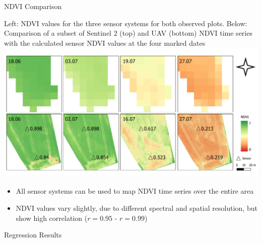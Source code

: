 \documentclass[final,hyperref={pdfpagelabels=false}]{beamer}
\begin{document}
\begin{frame}
\begin{minipage}[t][][t]{0.48\paperwidth}
\begin{block}{NDVI Comparison}
\begin{minipage}{0.16\paperwidth}
{
}%

\end{minipage}
\begin{minipage}{0.3\paperwidth}
\small{ Left: NDVI values for the three sensor systems for both observed plots. Below: Comparison of a subset of Sentinel 2 (top) and
UAV (bottom) NDVI time series with the calculated sensor NDVI values at the four marked dates}
\includegraphics[width = \textwidth]{maps/sentinel-p4.pdf}
\end{minipage}
\small{
\begin{itemize}
    \item All sensor systems can be used to map NDVI time series over the entire area
    \item NDVI values vary slightly, due to different spectral and spatial resolution, but show high correlation ($r=0.95$ - $r=0.99$)
\end{itemize}}
\vspace{0.21cm}
\end{block}
\end{minipage}
\hspace{4mm}
\begin{minipage}[t][][t]{0.48\paperwidth}
\begin{block}{Regression Results}
\begin{minipage}{0.17\paperwidth}

\end{minipage}
\end{block}
\end{minipage}
\end{frame}
\end{document}
